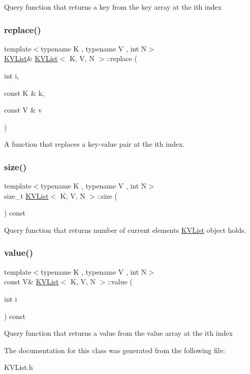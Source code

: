 Query function that returns a key from the key array at the i\textquotesingle{}th index \mbox{\label{classKVList_a8f09811cd71f9ff582ae0cde60d2cbea}} 
\subsubsection{\texorpdfstring{replace()}{replace()}}
{\footnotesize\ttfamily template$<$typename K , typename V , int N$>$ \\
\mbox{\hyperlink{classKVList}{K\+V\+List}}\& \mbox{\hyperlink{classKVList}{K\+V\+List}}$<$ K, V, N $>$\+::replace (\begin{DoxyParamCaption}\item[{int}]{i,  }\item[{const K \&}]{k,  }\item[{const V \&}]{v }\end{DoxyParamCaption})\hspace{0.3cm}{\ttfamily [inline]}}

A function that replaces a key-\/value pair at the i\textquotesingle{}th index. \mbox{\label{classKVList_a78553e3fffba19b64ae5d7404895070f}} 
\subsubsection{\texorpdfstring{size()}{size()}}
{\footnotesize\ttfamily template$<$typename K , typename V , int N$>$ \\
size\+\_\+t \mbox{\hyperlink{classKVList}{K\+V\+List}}$<$ K, V, N $>$\+::size (\begin{DoxyParamCaption}{ }\end{DoxyParamCaption}) const\hspace{0.3cm}{\ttfamily [inline]}}

Query function that returns number of current elements \mbox{\hyperlink{classKVList}{K\+V\+List}} object holds. \mbox{\label{classKVList_a9e88a57305e260e0e372a025d2d7b024}} 
\subsubsection{\texorpdfstring{value()}{value()}}
{\footnotesize\ttfamily template$<$typename K , typename V , int N$>$ \\
const V\& \mbox{\hyperlink{classKVList}{K\+V\+List}}$<$ K, V, N $>$\+::value (\begin{DoxyParamCaption}\item[{int}]{i }\end{DoxyParamCaption}) const\hspace{0.3cm}{\ttfamily [inline]}}

Query function that returns a value from the value array at the i\textquotesingle{}th index 

The documentation for this class was generated from the following file\+:\begin{DoxyCompactItemize}
\item 
K\+V\+List.\+h\end{DoxyCompactItemize}
